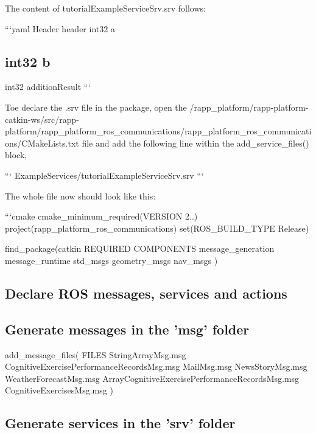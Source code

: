 The content of {\ttfamily tutorial\-Example\-Service\-Srv.\-srv} follows\-:

```yaml Header header int32 a \subsection*{int32 b }

int32 addition\-Result ```

Toe declare the .srv file in the package, open the {\ttfamily /rapp\-\_\-platform/rapp-\/platform-\/catkin-\/ws/src/rapp-\/platform/rapp\-\_\-platform\-\_\-ros\-\_\-communications/rapp\-\_\-platform\-\_\-ros\-\_\-communications/\-C\-Make\-Lists.txt} file and add the following line within the {\ttfamily add\-\_\-service\-\_\-files()} block,

``` Example\-Services/tutorial\-Example\-Service\-Srv.\-srv ```

The whole file now should look like this\-:

```cmake cmake\-\_\-minimum\-\_\-required(V\-E\-R\-S\-I\-O\-N 2..) project(rapp\-\_\-platform\-\_\-ros\-\_\-communications) set(\-R\-O\-S\-\_\-\-B\-U\-I\-L\-D\-\_\-\-T\-Y\-P\-E Release)

find\-\_\-package(catkin R\-E\-Q\-U\-I\-R\-E\-D C\-O\-M\-P\-O\-N\-E\-N\-T\-S message\-\_\-generation message\-\_\-runtime std\-\_\-msgs geometry\-\_\-msgs nav\-\_\-msgs )

\subparagraph*{}

\subsection*{Declare R\-O\-S messages, services and actions}

\subparagraph*{}

\subsection*{Generate messages in the 'msg' folder}

add\-\_\-message\-\_\-files( F\-I\-L\-E\-S String\-Array\-Msg.\-msg Cognitive\-Exercise\-Performance\-Records\-Msg.\-msg Mail\-Msg.\-msg News\-Story\-Msg.\-msg Weather\-Forecast\-Msg.\-msg Array\-Cognitive\-Exercise\-Performance\-Records\-Msg.\-msg Cognitive\-Exercises\-Msg.\-msg )

\subsection*{Generate services in the 'srv' folder}

